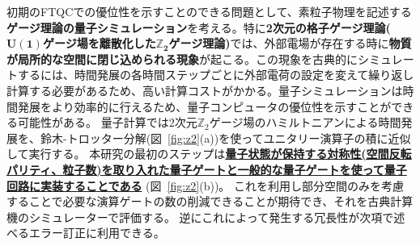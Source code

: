\documentclass[11pt,a4j,dvipdfmx]{jarticle} 					%
\newcommand{\研究課題名}{誤り耐性量子コンピュータに向けた誤り訂正技術の開発(仮)}
\newcommand{\研究機関名}{東京大学}
\newcommand{\研究代表者氏名}{寺師弘二}
\newcommand{\研究期間の最終元号年度}{10}  %
\newcommand{\mybf}[1]{{\bfseries\sffamily#1}}
\begin{document}
初期のFTQCでの優位性を示すことのできる問題として、素粒子物理を記述する\mybf{ゲージ理論の量子シミュレーション}を考える。特に\mybf{2次元の格子ゲージ理論($\pmb{U(1)}$ゲージ場を離散化した$\pmb{\mathbb{Z}_2}$ゲージ理論)}では、外部電場が存在する時に\mybf{物質が局所的な空間に閉じ込められる現象}が起こる。この現象を古典的にシミュレートするには、時間発展の各時間ステップごとに外部電荷の設定を変えて繰り返し計算する必要があるため、高い計算コストがかかる。量子シミュレーションは時間発展をより効率的に行えるため、量子コンピュータの優位性を示すことができる可能性がある。
量子計算では2次元$\mathbb{Z}_2$ゲージ場のハミルトニアンによる時間発展を、鈴木-トロッター分解(図~\ref{fig:z2}(a))を使ってユニタリー演算子の積に近似して実行する。
本研究の最初のステップは\mybf{\ul{量子状態が保持する対称性(空間反転パリティ、粒子数)を取り入れた量子ゲートと一般的な量子ゲートを使って量子回路に実装することである}} (図~\ref{fig:z2}(b))。
これを利用し部分空間のみを考慮することで必要な演算ゲートの数の削減できることが期待でき、それを古典計算機のシミュレーターで評価する。
逆にこれによって発生する冗長性が次項で述べるエラー訂正に利用できる。 \\
\end{document}
